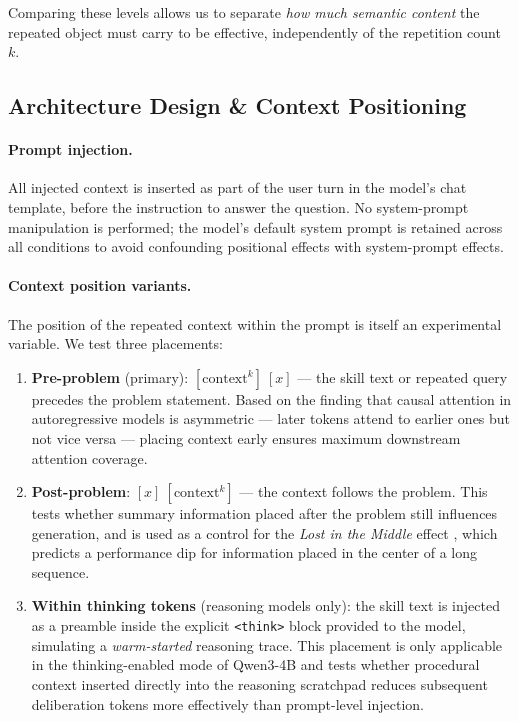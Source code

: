 Comparing these levels allows us to separate \emph{how much semantic content} the
repeated object must carry to be effective, independently of the repetition count $k$.

\subsection{Architecture Design \& Context Positioning}
\label{subsec:architecture}

\paragraph{Prompt injection.}
All injected context is inserted as part of the user turn in the model's chat template,
before the instruction to answer the question.
No system-prompt manipulation is performed; the model's default system prompt is retained
across all conditions to avoid confounding positional effects with system-prompt effects.

\paragraph{Context position variants.}
The position of the repeated context within the prompt is itself an experimental variable.
We test three placements:

\begin{enumerate}
  \item \textbf{Pre-problem} (primary): $[\mathrm{context}^k]\ [x]$ — the skill text or
        repeated query precedes the problem statement.
        Based on the finding that causal attention in autoregressive models is
        asymmetric — later tokens attend to earlier ones but not vice versa — placing
        context early ensures maximum downstream attention coverage.
  \item \textbf{Post-problem}: $[x]\ [\mathrm{context}^k]$ — the context follows the
        problem.  This tests whether summary information placed after the problem
        still influences generation, and is used as a control for the \emph{Lost in
        the Middle} effect \cite{liu2023lost}, which predicts a performance dip for
        information placed in the center of a long sequence.
  \item \textbf{Within thinking tokens} (reasoning models only): the skill text is
        injected as a preamble inside the explicit \texttt{<think>} block provided
        to the model, simulating a \emph{warm-started} reasoning trace.
        This placement is only applicable in the thinking-enabled mode of Qwen3-4B
        and tests whether procedural context inserted directly into the reasoning
        scratchpad reduces subsequent deliberation tokens more effectively than
        prompt-level injection.
\end{enumerate}

